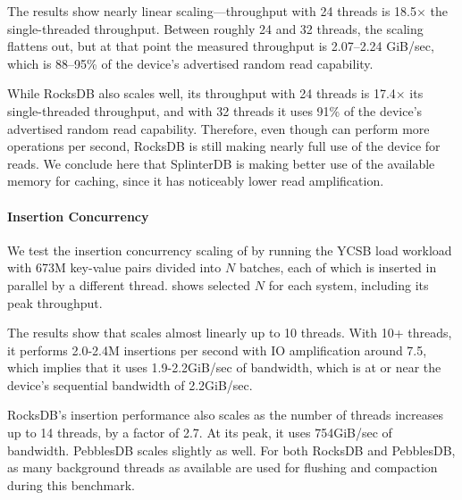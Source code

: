 The results show nearly linear scaling---throughput with 24 threads is
18.5$\times$ the single-threaded throughput. Between roughly 24 and 32 threads,
the scaling flattens out, but at that point the measured throughput is
2.07--2.24 GiB/sec, which is 88--95\% of the device's advertised random read
capability.

While RocksDB also scales well, its throughput with 24 threads is 17.4$\times$
its single-threaded throughput, and with 32 threads it uses 91\% of the
device's advertised random read capability. Therefore, even though \sysname can
perform more operations per second, RocksDB is still making nearly full use of
the device for reads. We conclude here that SplinterDB is making better use of
the available memory for caching, since it has noticeably lower read
amplification.

\paragraph{Insertion Concurrency}
We test the insertion concurrency scaling of \sysname by running the YCSB load
workload with 673M key-value pairs divided into $N$ batches, each of which
is inserted in parallel by a different thread. 
shows selected $N$ for each system, including its peak throughput.

The results show that \sysname scales almost linearly up to 10 threads. With
10+ threads, it performs 2.0-2.4M insertions per second with IO amplification
around 7.5, which implies that it uses 1.9-2.2GiB/sec of bandwidth, which is at
or near the device's sequential bandwidth of 2.2GiB/sec.

RocksDB's insertion performance also scales as the number of threads increases
up to 14 threads, by a factor of 2.7. At its peak, it uses 754GiB/sec of
bandwidth. PebblesDB scales slightly as well.  For both RocksDB and PebblesDB,
as many background threads as available are used for flushing and compaction
during this benchmark.

